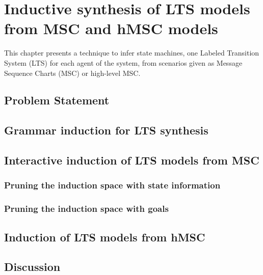 \chapter{Inductive synthesis of LTS models from MSC and hMSC models\label{chapter:inductive-synthesis}}

This chapter presents a technique to infer state machines, one Labeled Transition System (LTS) for each agent of the system, from scenarios given as Message Sequence Charts (MSC) or high-level MSC.


\section{Problem Statement}



\section{Grammar induction for LTS synthesis\label{section:inductive-background}}




\section{Interactive induction of LTS models from MSC}

\subsection{Pruning the induction space with state information}

\subsection{Pruning the induction space with goals}


\section{Induction of LTS models from hMSC}

\section{Discussion\label{section:inductive-discussion}}
